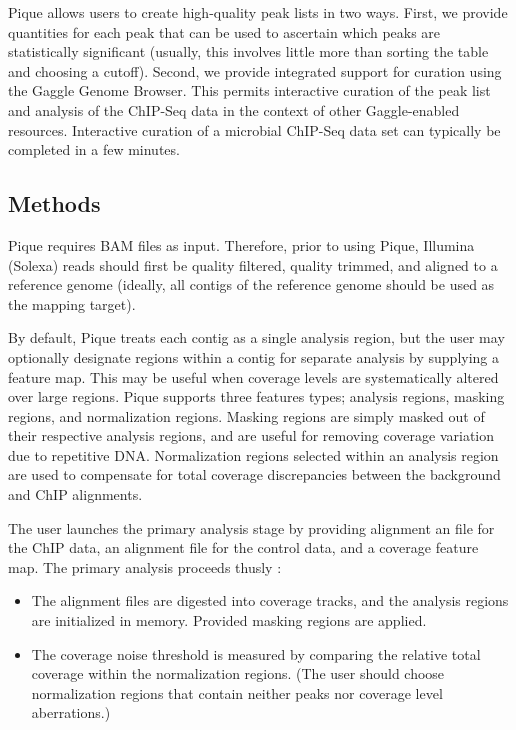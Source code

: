 \documentclass{bioinfo}
\begin{document}
Pique allows users to create high-quality peak lists in two ways.
First, we provide quantities for each peak that can be used to
ascertain which peaks are statistically significant (usually, this
involves little more than sorting the table and choosing a
cutoff). Second, we provide integrated support for curation using the
Gaggle Genome Browser. This permits interactive curation of the peak
list and analysis of the ChIP-Seq data in the context of other
Gaggle-enabled resources. Interactive curation of a microbial ChIP-Seq
data set can typically be completed in a few minutes.

\begin{methods}
\section{Methods}

\noindent Pique requires BAM files as input\cite{sam_format}.
Therefore, prior to using Pique, Illumina (Solexa) reads should first
be quality filtered, quality trimmed, and aligned to a reference
genome (ideally, all contigs of the reference genome should be used as
the mapping target).

By default, Pique treats each contig as a single analysis region, but
the user may optionally designate regions within a contig for separate
analysis by supplying a feature map.  This may be useful when coverage
levels are systematically altered over large regions.  Pique supports
three features types; analysis regions, masking regions, and
normalization regions. Masking regions are simply masked out of their
respective analysis regions, and are useful for removing coverage
variation due to repetitive DNA. Normalization regions selected within
an analysis region are used to compensate for total coverage
discrepancies between the background and ChIP alignments.

The user launches the primary analysis stage by providing alignment an
file for the ChIP data, an alignment file for the control data, and a
coverage feature map. The primary analysis proceeds thusly :

\begin{itemize}

\item The alignment files are digested into coverage tracks, and the
  analysis regions are initialized in memory. Provided masking regions
  are applied.

\item The coverage noise threshold is measured by comparing the
  relative total coverage within the normalization regions. (The user
  should choose normalization regions that contain neither peaks nor
  coverage level aberrations.)


\end{itemize}
\end{methods}
\end{document}
